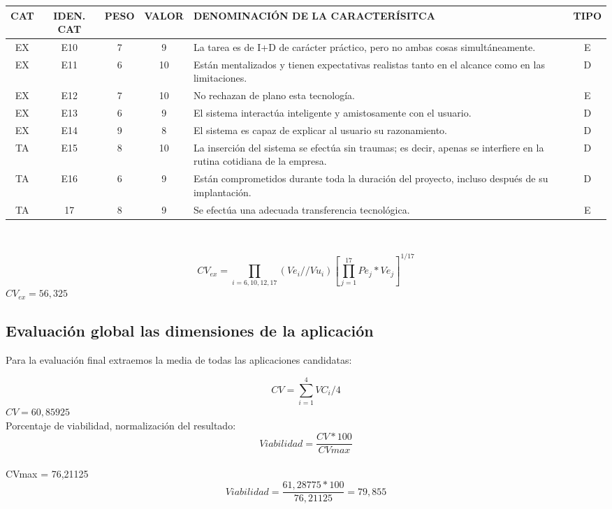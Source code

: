 \documentclass[letterpaper,12pt]{article}
\begin{document}
\begin{tabular}{|c|c|c|c|p{7.3 cm}|c|}
	\hline 
	CAT & IDEN. CAT & PESO & VALOR & DENOMINACIÓN DE LA CARACTERÍSITCA & TIPO \\ 
	\hline 
	EX & E10 & 7 & 9 & La tarea es de I+D de carácter práctico, pero no ambas cosas simultáneamente. & E \\ 
	\hline 
	EX & E11 & 6 & 10 & Están mentalizados y tienen expectativas realistas tanto en el alcance como en las limitaciones. & D \\ 
	\hline 
	EX & E12 & 7 & 10 & No rechazan de plano esta tecnología. & E \\ 
	\hline 
	EX & E13 & 6 & 9 & El sistema interactúa inteligente y amistosamente con el usuario. & D \\ 
	\hline 
	EX & E14 & 9 & 8 & El sistema es capaz de explicar al usuario su razonamiento. & D \\ 
	\hline 
	TA & E15 & 8 & 10 & La inserción del sistema se efectúa sin traumas; es decir, apenas se interfiere en la rutina cotidiana de la empresa. & D \\ 
	\hline 
	TA & E16 & 6 & 9 & Están comprometidos durante toda la duración del proyecto, incluso después de su implantación. & D \\ 
	\hline 
	TA & 17 & 8 & 9 & Se efectúa una adecuada transferencia tecnológica. & E \\ 
	\hline 
\end{tabular} \\
\begin{center}
	\[
	CV_{ex} = \prod_{i=6,10,12,17}(Ve_{i}//Vu_{i})[\prod_{j=1}^{17}Pe_{j}*Ve_{j}]^{1/17}
	\]
	$CV_{ex} = 56,325$
\end{center}
\newpage
\subsection{Evaluación global las dimensiones de la aplicación}
Para la evaluación final extraemos la media de todas las aplicaciones candidatas: 
\begin{center}
	\[
	CV = \sum_{i=1}^{4}VC_{i}/4
	\]
	$CV = 60,85925$
	\\
	Porcentaje de viabilidad, normalización del resultado:
	\begin{equation}
	\textit{Viabilidad} = \dfrac{CV*100}{CVmax} 
	\end{equation}\\
	
	CVmax = 76,21125 
	\begin{equation}
	\textit{Viabilidad} = \dfrac{61,28775*100}{76,21125} = 79,855 %
	\end{equation}
	
\end{center}
\end{document}
